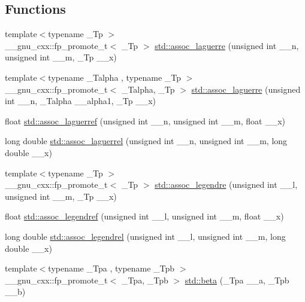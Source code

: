 \subsection*{Functions}
\begin{DoxyCompactItemize}
\item 
{\footnotesize template$<$typename \+\_\+\+Tp $>$ }\\\+\_\+\+\_\+gnu\+\_\+cxx\+::fp\+\_\+promote\+\_\+t$<$ \+\_\+\+Tp $>$ \hyperlink{group__cxx17__math__spec__func_ga0b33e0ac3066f2353861ce2f34b43f57}{std\+::assoc\+\_\+laguerre} (unsigned int \+\_\+\+\_\+n, unsigned int \+\_\+\+\_\+m, \+\_\+\+Tp \+\_\+\+\_\+x)
\item 
{\footnotesize template$<$typename \+\_\+\+Talpha , typename \+\_\+\+Tp $>$ }\\\+\_\+\+\_\+gnu\+\_\+cxx\+::fp\+\_\+promote\+\_\+t$<$ \+\_\+\+Talpha, \+\_\+\+Tp $>$ \hyperlink{group__cxx17__math__spec__func_gab135b6cb6154e6eccb7825ae939602db}{std\+::assoc\+\_\+laguerre} (unsigned int \+\_\+\+\_\+n, \+\_\+\+Talpha \+\_\+\+\_\+alpha1, \+\_\+\+Tp \+\_\+\+\_\+x)
\item 
float \hyperlink{group__cxx17__math__spec__func_gaf83d98f350a1cfcebee6a1f723cf90d2}{std\+::assoc\+\_\+laguerref} (unsigned int \+\_\+\+\_\+n, unsigned int \+\_\+\+\_\+m, float \+\_\+\+\_\+x)
\item 
long double \hyperlink{group__cxx17__math__spec__func_gac8e245671fb2df5de5fd978d03081f6c}{std\+::assoc\+\_\+laguerrel} (unsigned int \+\_\+\+\_\+n, unsigned int \+\_\+\+\_\+m, long double \+\_\+\+\_\+x)
\item 
{\footnotesize template$<$typename \+\_\+\+Tp $>$ }\\\+\_\+\+\_\+gnu\+\_\+cxx\+::fp\+\_\+promote\+\_\+t$<$ \+\_\+\+Tp $>$ \hyperlink{group__cxx17__math__spec__func_ga7aa4182446f687094b12688078517d53}{std\+::assoc\+\_\+legendre} (unsigned int \+\_\+\+\_\+l, unsigned int \+\_\+\+\_\+m, \+\_\+\+Tp \+\_\+\+\_\+x)
\item 
float \hyperlink{group__cxx17__math__spec__func_ga3ced07ddd24bf4af56e2712d148e7f57}{std\+::assoc\+\_\+legendref} (unsigned int \+\_\+\+\_\+l, unsigned int \+\_\+\+\_\+m, float \+\_\+\+\_\+x)
\item 
long double \hyperlink{group__cxx17__math__spec__func_ga55977b425a539146f060dec1c8003344}{std\+::assoc\+\_\+legendrel} (unsigned int \+\_\+\+\_\+l, unsigned int \+\_\+\+\_\+m, long double \+\_\+\+\_\+x)
\item 
{\footnotesize template$<$typename \+\_\+\+Tpa , typename \+\_\+\+Tpb $>$ }\\\+\_\+\+\_\+gnu\+\_\+cxx\+::fp\+\_\+promote\+\_\+t$<$ \+\_\+\+Tpa, \+\_\+\+Tpb $>$ \hyperlink{group__cxx17__math__spec__func_gacd36403ae64b89840b1504f97024dcee}{std\+::beta} (\+\_\+\+Tpa \+\_\+\+\_\+a, \+\_\+\+Tpb \+\_\+\+\_\+b)

\end{DoxyCompactItemize}
